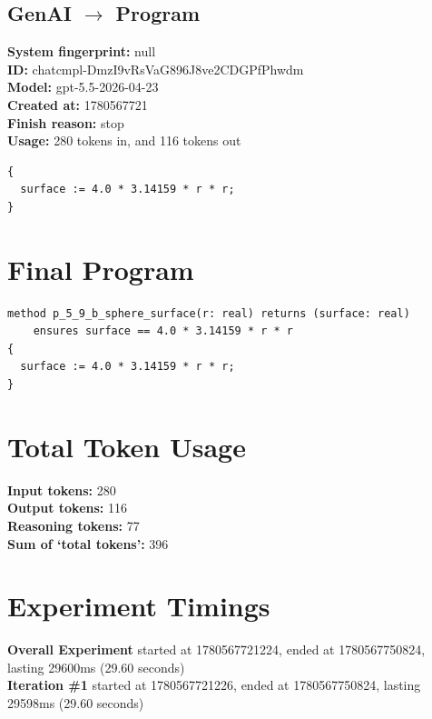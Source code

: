 \documentclass{article}
\begin{document}
\subsection*{GenAI $\rightarrow$ Program}
\textbf{System fingerprint: }null
\\\textbf{ID: }chatcmpl-DmzI9vRsVaG896J8ve2CDGPfPhwdm
\\\textbf{Model: }gpt-5.5-2026-04-23
\\\textbf{Created at: }1780567721
\\\textbf{Finish reason: }stop
\\\textbf{Usage: }280 tokens in, and 116 tokens out
\begin{lstlisting}
{
  surface := 4.0 * 3.14159 * r * r;
}
\end{lstlisting}
\section*{Final Program}
\begin{lstlisting}
method p_5_9_b_sphere_surface(r: real) returns (surface: real)
	ensures surface == 4.0 * 3.14159 * r * r
{
  surface := 4.0 * 3.14159 * r * r;
}
\end{lstlisting}
\section*{Total Token Usage}
\textbf{Input tokens: }280
\\\textbf{Output tokens: }116
\\\textbf{Reasoning tokens: }77
\\\textbf{Sum of `total tokens': }396
\section*{Experiment Timings}
\textbf{Overall Experiment} started at 1780567721224, ended at 1780567750824, lasting 29600ms (29.60 seconds)
\\\textbf{Iteration \#1} started at 1780567721226, ended at 1780567750824, lasting 29598ms (29.60 seconds)
\end{document}
